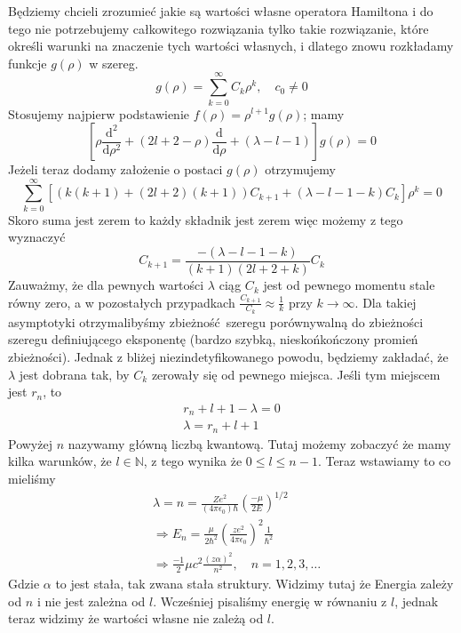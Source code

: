 Będziemy chcieli zrozumieć jakie są wartości własne operatora Hamiltona
i do tego nie potrzebujemy całkowitego rozwiązania tylko takie rozwiązanie,
które określi warunki na znaczenie tych wartości własnych,
i dlatego znowu rozkładamy funkcje $g(\rho)$ w szereg.
\begin{equation*}
	g(\rho)=\sum_{k=0}^{\infty} C_{k} \rho^{k}, \quad c_0 \neq 0
\end{equation*}
Stosujemy najpierw podstawienie $f(\rho) = \rho^{l+1}g(\rho)$; mamy
\begin{equation*}
	\left[\rho\frac{\text{d}^{2}}{\text{d} \rho^2}+(2l + 2 - \rho)\frac{\text{d}}{\text{d} \rho} + (\lambda - l - 1)\right] g(\rho)=0
\end{equation*}
Jeżeli teraz dodamy założenie o postaci $g(\rho)$ otrzymujemy
\begin{equation*}
	\sum_{k=0}^{\infty}\left[ \left( k(k+1) + (2l+2)(k+1) \right)C_{k+1} + (\lambda - l - 1 -k)C_k \right]\rho^k=0
\end{equation*}
Skoro suma jest zerem to każdy składnik jest zerem więc możemy z tego wyznaczyć
\begin{equation*}
	C_{k+1} = \frac{-(\lambda - l - 1 -k)}{(k+1)(2l+2+k)} C_k
\end{equation*}
Zauważmy, że dla pewnych wartości $\lambda$ ciąg $C_k$ jest od pewnego
momentu stale równy zero, a w pozostałych przypadkach
$\frac{C_{k+1}}{C_k} \approx \frac{1}{k}$ przy $k \to \infty$.
Dla takiej asymptotyki otrzymalibyśmy zbieżność szeregu porównywalną
do zbieżności szeregu definiującego eksponentę (bardzo szybką, nieskońkończony
promień zbieżności). Jednak z bliżej niezindetyfikowanego powodu,
będziemy zakładać, że $\lambda$ jest dobrana tak, by $C_k$ zerowały się
od pewnego miejsca. Jeśli tym miejscem jest $r_n$, to
\begin{equation*}
	\begin{gathered}
		r_n+ l +1 - \lambda = 0 \\
		\lambda = r_n + l +1
	\end{gathered}
\end{equation*}
Powyżej $n$ nazywamy główną liczbą kwantową. Tutaj możemy zobaczyć że mamy
kilka warunków, że $l \in \mathbb{N}$, z tego wynika że $0 \leq l \leq n - 1$.
Teraz wstawiamy to co mieliśmy 
\begin{equation*}
	\begin{split}
		&\lambda = n = \frac{Z e^2}{(4 \pi \epsilon_0) \hbar} \left(\frac{-\mu}{2E}\right)^{1/2} \\
		&\Rightarrow E_n = \frac{\mu}{2\hbar^2} \left( \frac{ze^2}{4 \pi \epsilon_0} \right)^2 \frac{1}{\hbar^2} \\
		&\Rightarrow \frac{-1}{2}\mu c^2 \frac{(z\alpha)^2}{n^2}, \quad n = 1, 2, 3, \dotsc
	\end{split}
\end{equation*}
Gdzie $\alpha$ to jest stała, tak zwana stała struktury. Widzimy tutaj że Energia zależy od $n$ i nie jest zależna od $l$. Wcześniej pisaliśmy energię w równaniu z $l$, jednak teraz widzimy że wartości własne nie zależą od $l$.

